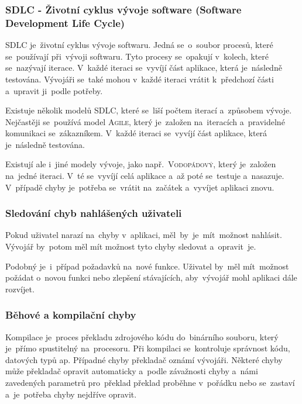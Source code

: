 \documentclass[14pt,a4paper]{article}
\begin{document}
            \subsubsection{SDLC - Životní cyklus vývoje software (Software Development Life Cycle)}
            SDLC je~životní cyklus vývoje softwaru. Jedná se~o~soubor procesů, které se~používají při~vývoji softwaru.
            Tyto procesy se~opakují v~kolech, které se~nazývají iterace. V~každé iteraci se~vyvíjí část aplikace, která je~následně testována.
            Vývojáři se~také mohou v~každé iteraci vrátit k~předchozí části a~upravit ji~podle potřeby.
            
            Existuje několik modelů \textsc{SDLC}, které se~liší počtem iterací a~způsobem vývoje. Nejčastěji se~používá model \textsc{Agile},
            který je~založen na~iteracích a~pravidelné komunikaci se~zákazníkem. V~každé iteraci se~vyvíjí část aplikace, která je~následně testována.
            
            Existují ale i~jiné modely vývoje, jako např.~\textsc{Vodopádový}, který je~založen na~jedné iteraci.
            V~té se~vyvíjí celá aplikace a~až poté se~testuje a~nasazuje.
            V~případě chyby je~potřeba se~vrátit na~začátek a~vyvíjet aplikaci znovu.

            \subsubsection{Sledování chyb nahlášených uživateli}
            Pokud uživatel narazí na~chyby v~aplikaci, měl~by~je~mít~možnost nahlásit. Vývojář by~potom měl mít možnost tyto chyby sledovat a~opravit~je.

            Podobný je~i~případ požadavků na~nové funkce. Uživatel by~měl mít~možnost požádat o~novou funkci nebo zlepšení stávajících,
            aby~vývojář mohl aplikaci dále rozvíjet.

            \subsubsection{Běhové a kompilační chyby}
            Kompilace je~proces překladu zdrojového kódu do~binárního souboru, který je~přímo spustitelný na~procesoru.
            Při kompilaci se~kontroluje správnost kódu, datových typů ap. Případné chyby překladač oznámí vývojáři.
            Některé chyby může překladač opravit automaticky a~podle závažnosti chyby a~námi zavedených parametrů pro~překlad
            překlad proběhne v~pořádku nebo se~zastaví a~je~potřeba chyby nejdříve opravit.
\end{document}
